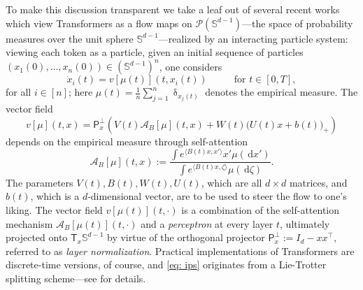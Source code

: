 \documentclass[a4paper,11pt]{article}
\theoremstyle{plain}
\newcommand{\proj}{\bm{\mathsf{P}}^\perp}
\newcommand{\diff}{\, \mathrm{d}}
\renewcommand{\S}{\mathbb{S}^{d-1}}
\newcommand{\Tan}{\mathsf{T}}
\newcommand{\cP}{\mathscr{P}}
\newcommand{\bW}{\bm{\mathit{W}}}
\newcommand{\bV}{\bm{\mathit{V}}}
\newcommand{\bB}{\bm{\mathit{B}}}
\newcommand{\bU}{\bm{\mathit{U}}}
\numberwithin{equation}{section}
\newcommand{\nbbg}[1]{ {\text{\bf bg:} \color{mygrey}{#1}} }
\newcommand{\ndpr}[1]{ {\colorbox{MIT}{\color{white} \textsf{PR}} \color{MIT}{#1}} }
\newcommand{\npdr}[1]{ {\colorbox{MIT}{\color{white} \textsf{PR}} \color{MIT}{#1}} }
\begin{document}
To make this discussion transparent we take a leaf out of several recent works \cite{sander2022sinkformers, vuckovic2020mathematical, geshkovski2023mathematical} 
which view Transformers as a flow maps on $\cP(\S)$---the space of probability measures over the unit sphere $\S$---realized by an interacting particle system: viewing each token as a particle, given an initial sequence of particles $(x_1(0),\ldots,x_n(0))\in(\S)^n$, one considers 
\begin{equation} \label{eq: ips}
    \dot{x}_i(t) = v[\mu(t)](t,x_i(t)) \hspace{1cm} \text{ for } t\in[0,T],
\end{equation}
for all $i\in[n]$; here $\mu(t)=\frac{1}{n}\sum_{j=1}^n \updelta_{x_j(t)}$ denotes the empirical measure. 
The vector field
\begin{equation} \label{eq: vf}
v[\mu](t,x) = \proj_{x}\left(\bV(t)\mathscr{A}_{\bB}[\mu](t,x)+\bW(t)\big(\bU(t)x+b(t)\big)_+\right)
\end{equation}
depends on the empirical measure through self-attention
\begin{equation} \label{eq: attention}
    \mathscr{A}_{\bB}[\mu](t,x) := \dfrac{\displaystyle\int e^{\langle \bB(t)x, x'\rangle}x'\mu(\diff x')}{\displaystyle\int e^{\langle \bB(t)x, \zeta\rangle}\mu(\diff\zeta)}.
\end{equation}
The parameters $\bV(t),\bB(t),\bW(t),\bU(t)$, which are all $d\times d$ matrices, and $b(t)$, which is a $d$-dimensional vector, are to be used to steer the flow to one's liking. The vector field $v[\mu(t)](t,\cdot)$ is a combination of the self-attention mechanism $\mathscr{A}_{\bB}[\mu(t)](t,\cdot)$ and a \emph{perceptron}
at every layer $t$, ultimately projected onto $\Tan_x\S$ by virtue of the orthogonal projector $\proj_x:= I_d-xx^\top$, referred to as \emph{layer normalization}.
Practical implementations of Transformers are  discrete-time versions, of course, and \eqref{eq: ips} originates from a Lie-Trotter splitting scheme---see {\bf {}} for details.
\end{document}
